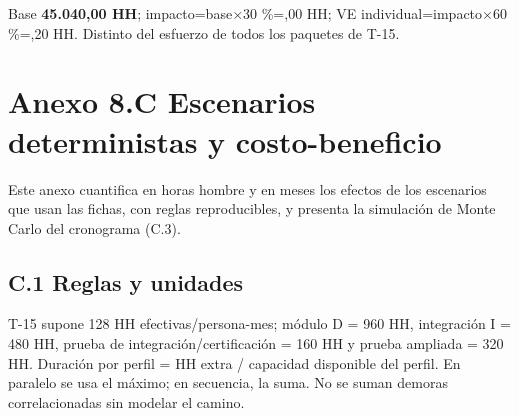 Base \textbf{45.040,00 HH}; impacto=\allowbreak base\ensuremath{\times}30 \%=,00 HH; VE individual=\allowbreak impacto\ensuremath{\times}60 \%=,20 HH. Distinto del esfuerzo de todos los paquetes de T-15.

\clearpage
\section*{Anexo 8.C \textemdash{} Escenarios deterministas y costo-beneficio}

Este anexo cuantifica en horas hombre y en meses los efectos de los escenarios que usan las fichas, con reglas reproducibles, y presenta la simulación de Monte Carlo del cronograma (C.3).

\subsection*{C.1 Reglas y unidades}

T-15 supone 128 HH efectivas/persona-mes; módulo D = 960 HH, integración I = 480 HH, prueba de integración/certificación = 160 HH y prueba ampliada = 320 HH. Duración por perfil = HH extra / capacidad disponible del perfil. En paralelo se usa el máximo; en secuencia, la suma. No se suman demoras correlacionadas sin modelar el camino.

